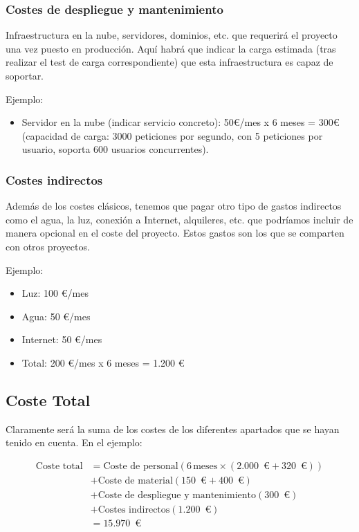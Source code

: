 \subsubsection{Costes de despliegue y mantenimiento}

Infraestructura en la nube, servidores, dominios, etc. que requerirá el proyecto una vez puesto en producción. Aquí habrá que indicar la carga estimada (tras realizar el test de carga correspondiente) que esta infraestructura es capaz de soportar.

Ejemplo:
\begin{itemize}
\item Servidor en la nube (indicar servicio concreto): 50€/mes x 6 meses = 300€ (capacidad de carga: 3000 peticiones por segundo, con 5 peticiones por usuario, soporta 600 usuarios concurrentes).
\end{itemize}
        
\subsubsection{Costes indirectos}

Además de los costes clásicos, tenemos que pagar otro tipo de gastos indirectos como el agua, la luz, conexión a Internet, alquileres, etc. que podríamos incluir de manera opcional en el coste del proyecto. Estos gastos son los que se comparten con otros proyectos.

Ejemplo:
\begin{itemize}
    \item Luz: 100 €/mes
    \item Agua: 50 €/mes 
    \item Internet: 50 €/mes
    \item Total: 200 €/mes x 6 meses = 1.200 €
\end{itemize}
\subsection{Coste Total}
Claramente será la suma de los costes de los diferentes apartados que se hayan tenido en cuenta. En el ejemplo:

\begin{equation*}
\begin{split}
    \text{Coste total} &= \text{Coste de personal} \left(6 \, \text{meses} \times (2{.}000\,\text{ €} + 320\,\text{ €})\right) \\
    &+ \text{Coste de material} (150\,\text{ €} + 400\,\text{ €}) \\
    &+ \text{Coste de despliegue y mantenimiento} (300\,\text{ €}) \\
    &+ \text{Costes indirectos} (1{.}200\,\text{ €}) \\
    &= 15{.}970\,\text{ €}
\end{split}
\end{equation*}

